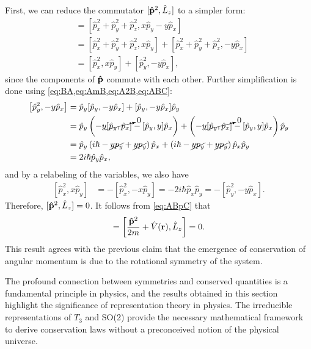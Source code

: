 First, we can reduce the commutator $[\mathbf{\hat{p}}^2,\hat{L}_z]$ to a simpler form:
\begin{align*}
    [\vh{p}^2,\hat{L}_z]
        &= \left[ \hat{p}_x^2 + \hat{p}_y^2 + \hat{p}_z^2, x \hat{p}_y - y \hat{p}_x\right] \\
        &= \left[ \hat{p}_x^2 + \hat{p}_y^2 + \hat{p}_z^2, x \hat{p}_y \right] + \left[ \hat{p}_x^2 + \hat{p}_y^2 + \hat{p}_z^2, -y \hat{p}_x \right] \\
        &= \left[ \hat{p}_x^2, x \hat{p}_y \right] + \left[ \hat{p}_y^2, -y \hat{p}_x \right],
\end{align*}
since the components of $\mathbf{\hat{p}}$ commute with each other. Further simplification is done using \cref{eq:BA,eq:AmB,eq:A2B,eq:ABC}:
\begin{align*}
    \left[ \hat{p}_y^2, -y \hat{p}_x \right]
        &= \hat{p}_y [\hat{p}_y, -y \hat{p}_x ] + [\hat{p}_y, -y \hat{p}_x ]\hat{p}_y \\
        &= \hat{p}_y \left( -y \cancelto{0}{[\hat{p}_y, \hat{p}_x ]} - [\hat{p}_y, y] \hat{p}_x \right) + \left( -y \cancelto{0}{[\hat{p}_y, \hat{p}_x ]} - [\hat{p}_y, y] \hat{p}_x \right)\hat{p}_y \\
        &= \hat{p}_y \left( i\hbar - \cancel{yp_y} + \cancel{yp_y} \right) \hat{p}_x + \left( i\hbar - \cancel{yp_y} + \cancel{yp_y} \right) \hat{p}_x\hat{p}_y \\
        &= 2i\hbar \hat{p}_y \hat{p}_x,
\end{align*}
and by a relabeling of the variables, we also have
\begin{align*}
    \left[ \hat{p}_x^2, x \hat{p}_y \right] &= -\left[ \hat{p}_x^2, -x \hat{p}_y \right] = -2i\hbar \hat{p}_x \hat{p}_y = -\left[ \hat{p}_y^2, -y \hat{p}_x \right].
\end{align*}
Therefore, $[\mathbf{\hat{p}}^2,\hat{L}_z] = 0$. It follows from \cref{eq:ABpC} that
\begin{align*}
    [\hat{H},\hat{L}_z] = \left[ \frac{\vh{p}^2}{2m}  + \hat{V}(\vec{r}), \hat{L}_z \right] = 0.
\end{align*}
This result agrees with the previous claim that the emergence of conservation of angular momentum is due to the rotational symmetry of the system.

The profound connection between symmetries and conserved quantities is a fundamental principle in physics, and the results obtained in this section highlight the significance of representation theory in physics. The irreducible representations of $T_3$ and SO(2) provide the necessary mathematical framework to derive conservation laws without a preconceived notion of the physical universe.

